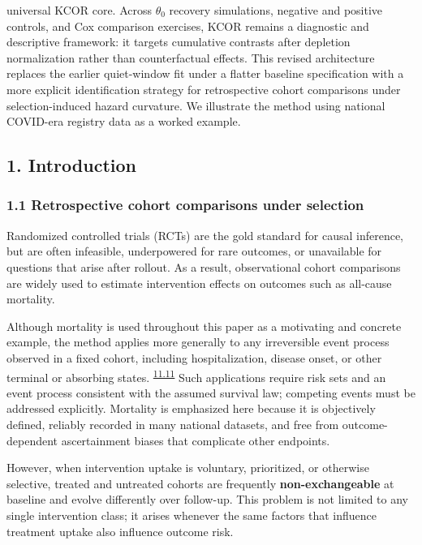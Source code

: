 \documentclass[
]{article}
\begin{document}
universal KCOR core. Across \(\theta_0\) recovery simulations, negative and positive controls, and Cox comparison exercises, KCOR remains a diagnostic and descriptive framework: it targets cumulative contrasts after depletion normalization rather than counterfactual effects. This revised architecture replaces the earlier quiet-window fit under a flatter baseline specification with a more explicit identification strategy for retrospective cohort comparisons under selection-induced hazard curvature. We illustrate the method using national COVID-era registry data as a worked example.

\subsection{1. Introduction}\label{introduction}

\subsubsection{1.1 Retrospective cohort comparisons under selection}\label{retrospective-cohort-comparisons-under-selection}

Randomized controlled trials (RCTs) are the gold standard for causal inference, but are often infeasible, underpowered for rare outcomes, or unavailable for questions that arise after rollout. As a result, observational cohort comparisons are widely used to estimate intervention effects on outcomes such as all-cause mortality.

Although mortality is used throughout this paper as a motivating and concrete example, the method applies more generally to any irreversible event process observed in a fixed cohort, including hospitalization, disease onset, or other terminal or absorbing states. \textsuperscript{\hyperlink{issue-11.11}{11.11}} {\color{red} Such applications require risk sets and an event process consistent with the assumed survival law; competing events must be addressed explicitly.} Mortality is emphasized here because it is objectively defined, reliably recorded in many national datasets, and free from outcome-dependent ascertainment biases that complicate other endpoints.

However, when intervention uptake is voluntary, prioritized, or otherwise selective, treated and untreated cohorts are frequently \textbf{non-exchangeable} at baseline and evolve differently over follow-up. This problem is not limited to any single intervention class; it arises whenever the same factors that influence treatment uptake also influence outcome risk.
\end{document}
